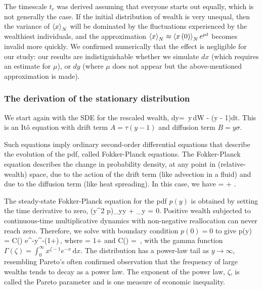 The timescale $t_c$ was derived assuming that everyone starts out equally, which is not generally the case. If the initial distribution of wealth is very unequal, then the variance of $\left\langle x \right\rangle_N$ will be dominated by the fluctuations experienced by the wealthiest individuals, and the approximation $\left\langle x \right\rangle_N\approx \left\langle x\left(0\right) \right\rangle_N e^{\mu t}$ becomes invalid more quickly. We confirmed numerically that the effect is negligible for our study: our results are indistiguishable whether we simulate $dx$ (which requires an estimate for $\mu$), or $dy$ (where $\mu$ does not appear but the above-mentioned approximation is made).

\clearpage

\subsubsection{The derivation of the stationary distribution}\label{app:stat}

We start again with the SDE for the rescaled wealth, 
\be
dy= \sigma\,y\,dW - \tau\left(y - 1\right)dt.
\ee
This is an It\^o equation with drift term 
$A=\tau(y - 1)$ and diffusion term $B=y \sigma$.

Such equations imply ordinary second-order differential equations that describe the evolution of the pdf, called Fokker-Planck equations. 
The Fokker-Planck equation describes the change in probability density, at any point in (relative-wealth) space, due to the action of the drift term (like advection in a fluid) and due to the diffusion term (like heat spreading). In this case, we have
\be
{}= + .
\ee

The steady-state Fokker-Planck equation for the pdf $p\left(y\right)$ is obtained by setting the time derivative to zero,
\be
{}\left(y^2 p\right)_{yy} + \tau{}_y = 0.
\ee
Positive wealth subjected to continuous-time multiplicative dynamics with non-negative reallocation can never reach zero. Therefore, we solve  with boundary condition $p\left(0\right)=0$ to give
\be
p\left(y\right) = C\left(\zeta\right) e^{-}y^{-\left(1+\zeta\right)}\,,
\ee
where 
\be
\zeta = 1+
\ee
and
\be
C\left(\zeta\right) = \frac{\left(\zeta -1\right)^\zeta}{\Gamma \left(\zeta \right)}\,,
\ee
with the gamma function $\Gamma\left(\zeta\right) = \int_0^\infty x^{\zeta-1} e^{-x}\,\mathrm{d}x$. The distribution has a power-law tail as $y\to\infty$, resembling Pareto's often confirmed observation that the frequency of large wealths tends to decay as a power law. The exponent of the power law, $\zeta$, is called the Pareto parameter and is one measure of economic inequality.

